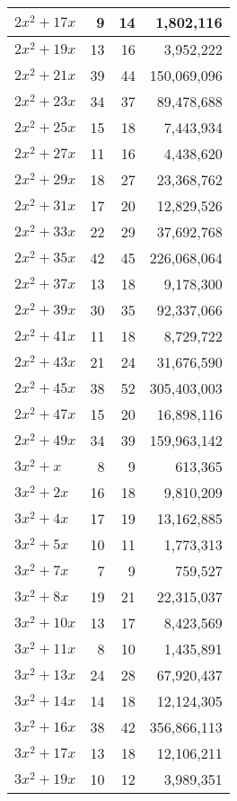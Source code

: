 \documentclass[a4paper]{amsproc}
\theoremstyle{plain}
\theoremstyle{named}
\begin{document}
\begin{longtable}{ | l | r | r | r | }
$2x^2 + 17x$ & 9 & 14 & 1{,}802{,}116 \\ \hline
$2x^2 + 19x$ & 13 & 16 & 3{,}952{,}222 \\ \hline
$2x^2 + 21x$ & 39 & 44 & 150{,}069{,}096 \\ \hline
$2x^2 + 23x$ & 34 & 37 & 89{,}478{,}688 \\ \hline
$2x^2 + 25x$ & 15 & 18 & 7{,}443{,}934 \\ \hline
$2x^2 + 27x$ & 11 & 16 & 4{,}438{,}620 \\ \hline
$2x^2 + 29x$ & 18 & 27 & 23{,}368{,}762 \\ \hline
$2x^2 + 31x$ & 17 & 20 & 12{,}829{,}526 \\ \hline
$2x^2 + 33x$ & 22 & 29 & 37{,}692{,}768 \\ \hline
$2x^2 + 35x$ & 42 & 45 & 226{,}068{,}064 \\ \hline
$2x^2 + 37x$ & 13 & 18 & 9{,}178{,}300 \\ \hline
$2x^2 + 39x$ & 30 & 35 & 92{,}337{,}066 \\ \hline
$2x^2 + 41x$ & 11 & 18 & 8{,}729{,}722 \\ \hline
$2x^2 + 43x$ & 21 & 24 & 31{,}676{,}590 \\ \hline
$2x^2 + 45x$ & 38 & 52 & 305{,}403{,}003 \\ \hline
$2x^2 + 47x$ & 15 & 20 & 16{,}898{,}116 \\ \hline
$2x^2 + 49x$ & 34 & 39 & 159{,}963{,}142 \\ \hline
$3x^2 + x$ & 8 & 9 & 613{,}365 \\ \hline
$3x^2 + 2x$ & 16 & 18 & 9{,}810{,}209 \\ \hline
$3x^2 + 4x$ & 17 & 19 & 13{,}162{,}885 \\ \hline
$3x^2 + 5x$ & 10 & 11 & 1{,}773{,}313 \\ \hline
$3x^2 + 7x$ & 7 & 9 & 759{,}527 \\ \hline
$3x^2 + 8x$ & 19 & 21 & 22{,}315{,}037 \\ \hline
$3x^2 + 10x$ & 13 & 17 & 8{,}423{,}569 \\ \hline
$3x^2 + 11x$ & 8 & 10 & 1{,}435{,}891 \\ \hline
$3x^2 + 13x$ & 24 & 28 & 67{,}920{,}437 \\ \hline
$3x^2 + 14x$ & 14 & 18 & 12{,}124{,}305 \\ \hline
$3x^2 + 16x$ & 38 & 42 & 356{,}866{,}113 \\ \hline
$3x^2 + 17x$ & 13 & 18 & 12{,}106{,}211 \\ \hline
$3x^2 + 19x$ & 10 & 12 & 3{,}989{,}351 \\ \hline

\end{longtable}
\end{document}
